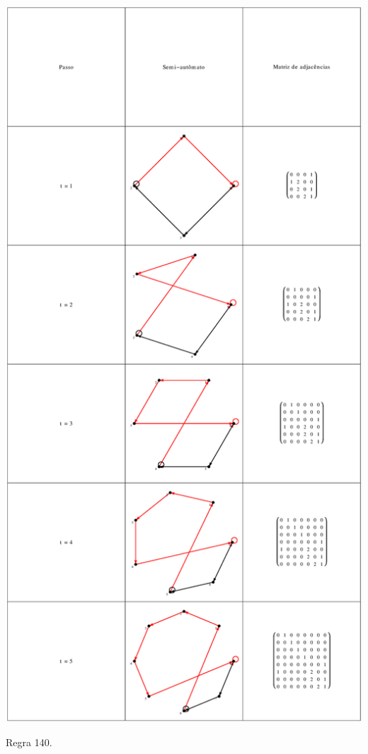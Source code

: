 \documentclass[12pt,a4paper]{article}
\begin{document}
\begin{table}[H]
\begin{center}
\includegraphics[scale=0.32]{img/mat/matr140.eps}
\caption{Regra 140.}
\label{tab:mr140}
\end{center}
\end{table}
\end{document}

